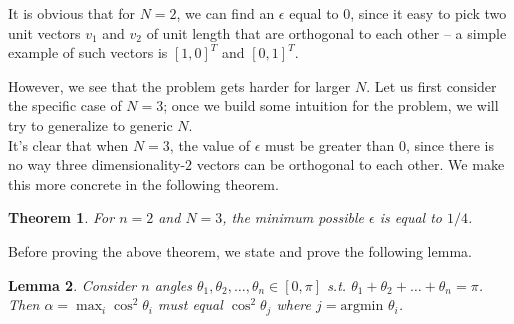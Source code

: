 \documentclass[11pt,letterpaper,twoside,english]{article}
\theoremstyle{theorem}
\newtheorem{theorem}{Theorem}[section]
\newtheorem{lemma}[theorem]{Lemma}
\theoremstyle{remark}
\begin{document}
It is obvious that for $N=2$, we can find an $\epsilon$ equal to $0$, since it easy to pick two unit vectors $v_1$ and $v_2$ of unit length that are orthogonal to each other -- a simple example of such vectors is $[1, 0]^T$ and $[0, 1]^T$. 

However, we see that the problem gets harder for larger $N$. Let us first consider the specific case of $N=3$; once we build some intuition for the problem, we will try to generalize to generic $N$.
\\

It's clear that when $N=3$, the value of $\epsilon$ must be greater than $0$, since there is no way three dimensionality-$2$ vectors can be orthogonal to each other. We make this more concrete in the following theorem.

\begin{theorem}
For $n=2$ and $N=3$, the minimum possible $\epsilon$ is equal to $1/4$.
\end{theorem}

Before proving the above theorem, we state and prove the following lemma.

\begin{lemma}
Consider $n$ angles $\theta_1, \theta_2, \ldots, \theta_n \in [0, \pi]$ s.t. $\theta_1 + \theta_2 + \ldots + \theta_n = \pi$. Then $\alpha = \max_i \cos^2 \theta_i$ must equal $\cos^2 \theta_j$ where $j = \text{argmin }\theta_i$.
\end{lemma}
\end{document}
